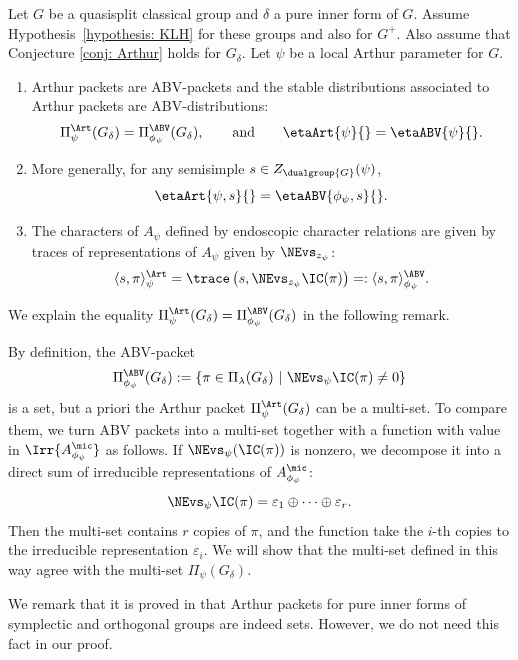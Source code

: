 \documentclass[11pt,letterpaper]{amsart}
\numberwithin{equation}{section}
\begin{document}
\begin{theorem}\label{theorem: Vogan's conjecture}
Let $G$ be a quasisplit classical group and $\delta$ a pure inner form of $G$.
Assume Hypothesis~\ref{hypothesis: KLH} for these groups and also for $G^+$. Also assume that Conjecture \ref{conj: Arthur} holds for $G_{\delta}$. 
Let $\psi$ be a local Arthur parameter for $G$.
\begin{enumerate}
    \item[(i)]
    Arthur packets are ABV-packets and the stable distributions associated to Arthur packets are ABV-distributions:
\[
\Pi^\Art_{\psi}(G_{\delta}) 
=
\Pi^\ABV_{\phi_{\psi}}(G_{\delta}),
\qquad\text{and}\qquad
\etaArt{\psi}{}
=
\etaABV{\psi}{}.
\]
\item[(ii)]
More generally, for any semisimple $s\in Z_{\dualgroup{G}}(\psi)$,
\[
\etaArt{\psi,s}{}
=
\etaABV{\phi_{\psi},s}{}.
\]
\item[(iii)]
The characters of $A_{\psi}$ defined by endoscopic character relations are given by traces of representations of $A_{\psi}$ given by $\NEvs_{z_{\psi}}$: 
    \[
    \langle s,\pi\rangle_{\psi}^{\Art}
    =
    \trace\left(s, \NEvs_{z_{\psi}}\IC(\pi)\right)
    =: \langle s,\pi\rangle_{\phi_{\psi}}^{\ABV}.
\]
\end{enumerate}
\end{theorem}
We explain the equality $\Pi^\Art_{\psi}(G_{\delta}) 
=
\Pi^\ABV_{\phi_{\psi}}(G_{\delta})$ in the following remark.

\begin{remark}\label{remark: multiset}
By definition, the ABV-packet 
\[\Pi_{\phi_{\psi}}^{\ABV}(G_{\delta}):=\{\pi \in \Pi_{\lambda}(G_{\delta})\ | \ \NEvs_{\psi}\IC(\pi)\neq 0\}\]
is a set, but a priori the Arthur packet $\Pi^\Art_{\psi}(G_{\delta}) $ can be a multi-set. To compare them, we turn ABV packets into a multi-set together with a function with value in $\Irr{A_{\phi_{\psi}}^{\mic}}$ as follows. If $\NEvs_{\psi}(\IC(\pi))$ is nonzero, we decompose it into a direct sum of irreducible representations of $A_{\phi_{\psi}}^{\mic}$:
\[ \NEvs_{\psi} \IC(\pi) = \varepsilon_1\oplus \cdots \oplus \varepsilon_{r}.\]
Then the multi-set contains $r$ copies of $\pi$, and the function take the $i$-th copies to the irreducible representation $\varepsilon_i$. We will show that the multi-set defined in this way agree with the multi-set $\Pi_{\psi}(G_{\delta})$.

We remark that it is proved in \cites{Moe11, Moe11b} that Arthur packets for pure inner forms of symplectic and orthogonal groups are indeed sets. However, we do not need this fact in our proof.
\end{remark}
\end{document}
